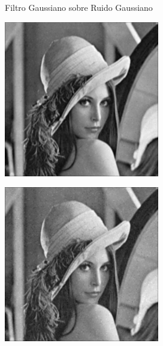 \documentclass{beamer}
\begin{document}
\begin{frame}[fragile]{Filtro Gaussiano sobre Ruido Gaussiano}
	\begin{minipage}{0.25\linewidth}
		\centering
		\includegraphics[width=\linewidth]{../results/lena_gauss_sigma10_gaussiano}
	\end{minipage}\hfill
	\begin{minipage}{0.25\linewidth}
		\centering
		\includegraphics[width=\linewidth]{../results/lena_gauss_sigma20_gaussiano}

\end{minipage}
\end{frame}
\end{document}
